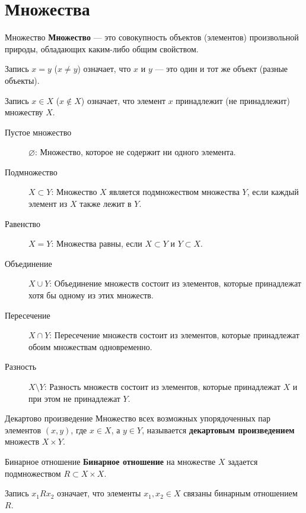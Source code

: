 \section{Множества}

\begin{definition}{Множество}{}
    \textbf{Множество} --- это совокупность объектов (элементов) произвольной природы,
    обладающих каким-либо общим свойством.
\end{definition}

Запись $x = y$ ($x \neq y$) означает, что $x$ и $y$ --- это один и тот же объект (разные объекты).

Запись $x \in X$ ($x \notin X$) означает, что элемент $x$ принадлежит (не принадлежит) множеству $X$.

\begin{description}
    \item [Пустое множество] $\varnothing$: Множество, которое не содержит ни одного элемента.
    \item [Подмножество] $X \subset Y$: Множество $X$ является подмножеством множества $Y$,
        если каждый элемент из $X$ также лежит в $Y$.
    \item [Равенство] $X = Y$: Множества равны, если $X \subset Y$ и $Y \subset X$.
    \item [Объединение] $X \cup Y$: Объединение множеств состоит из элементов,
        которые принадлежат хотя бы одному из этих множеств.
    \item [Пересечение] $X \cap Y$: Пересечение множеств состоит из элементов,
        которые принадлежат обоим множествам одновременно.
    \item [Разность] $X \setminus Y$: Разность множеств состоит из элементов,
        которые принадлежат $X$ и при этом не принадлежат $Y$.
\end{description}

\begin{definition}{Декартово произведение}{}
    Множество всех возможных упорядоченных пар элементов $(x, y)$, где $x \in X$, а $y \in Y$,
    называется \textbf{декартовым произведением} множеств $X \times Y$.
\end{definition}

\begin{definition}{Бинарное отношение}{}
    \textbf{Бинарное отношение} на множестве $X$ задается подмножеством $R \subset X \times X$.
\end{definition}

Запись $x_1 R x_2$ означает, что элементы $x_1, x_2 \in X$ связаны бинарным отношением $R$.

